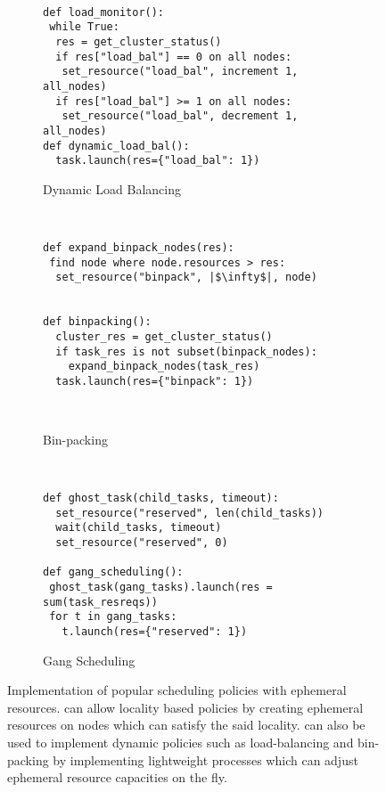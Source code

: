 \begin{figure*}[t]
\newline
\vspace{2.0mm}

~
~
\begin{subfigure}[b]{\colmult\textwidth}
  \centering
  \begin{verbatim}
def load_monitor():
 while True:
  res = get_cluster_status()
  if res["load_bal"] == 0 on all nodes:
   set_resource("load_bal", increment 1, all_nodes)
  if res["load_bal"] >= 1 on all nodes:
   set_resource("load_bal", decrement 1, all_nodes)
def dynamic_load_bal():
  task.launch(res={"load_bal": 1})
  \end{verbatim}
  \caption{Dynamic Load Balancing}
  \label{fig:policycode:dynloadbal}
\end{subfigure}
~
~
\begin{subfigure}[b]{\colmult\textwidth}
  \centering
  \begin{verbatim}
def expand_binpack_nodes(res):
 find node where node.resources > res:
  set_resource("binpack", |$\infty$|, node)


def binpacking():
  cluster_res = get_cluster_status()
  if task_res is not subset(binpack_nodes):
    expand_binpack_nodes(task_res)
  task.launch(res={"binpack": 1})
  
  
  \end{verbatim}
  \caption{Bin-packing}
  \label{fig:policycode:binpacking}
\end{subfigure}
~
~
\begin{subfigure}[b]{\colmult\textwidth}
  \centering
  \begin{verbatim}
def ghost_task(child_tasks, timeout):
  set_resource("reserved", len(child_tasks))
  wait(child_tasks, timeout)
  set_resource("reserved", 0)

def gang_scheduling():
 ghost_task(gang_tasks).launch(res = sum(task_resreqs))
 for t in gang_tasks: 
   t.launch(res={"reserved": 1})
  \end{verbatim}
  \caption{Gang Scheduling}
  \label{fig:policycode:gangsched}
\end{subfigure}

\caption{\small Implementation of popular scheduling policies with ephemeral resources. \name{} can allow locality based policies by creating ephemeral resources on nodes which can satisfy the said locality. \name{} can also be used to implement dynamic policies such as load-balancing and bin-packing by implementing lightweight processes which can adjust ephemeral resource capacities on the fly.}
\label{fig:policycode}
\end{figure*}